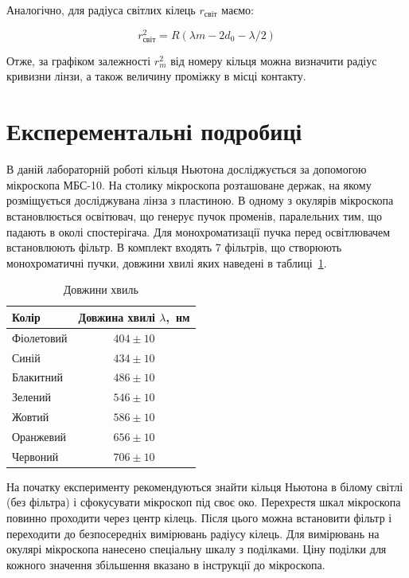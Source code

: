 \documentclass{LabWorkTemplate}
\begin{document}
Аналогічно, для радіуса світлих кілець $r_\text{світ}$ маємо:

\begin{equation}
\label{rlight}
r_\text{світ}^2=R(\lambda m-2d_{0}-\lambda/2)
\end{equation}

Отже, за графіком залежності $r^2_m$ від номеру кільця можна визначити радіус кривизни лінзи, а також величину проміжку в місці контакту.

\section{Експерементальні подробиці}


В даній лабораторній роботі кільця Ньютона досліджується за допомогою мікроскопа МБС-10. На столику мікроскопа розташоване держак, на якому розміщується досліджувана лінза з пластиною. В одному з окулярів мікроскопа встановлюється освітювач, що генерує пучок променів, паралельних тим, що падають в околі спостерігача. Для монохроматизації пучка перед освітлювачем встановлюють фільтр. В комплект входять 7 фільтрів, що створюють  монохроматичні пучки, довжини хвилі яких наведені в таблиці~\ref{WaveLength}.

\begin{table}
	\centering
	\begin{tabular}{lc}
		\toprule
		Колір                          & Довжина хвилі $\lambda$,~нм \\ \midrule
		\rowcolor{violet!10}Фіолетовий &             $ 404 \pm 10$             \\
		\rowcolor{blue!10}Синій        &             $ 434 \pm 10$             \\
		\rowcolor{cyan!10}Блакитний    &             $ 486 \pm 10 $             \\
		\rowcolor{green!10}Зелений     &             $ 546 \pm 10 $             \\
		\rowcolor{yellow!10}Жовтий     &             $ 586 \pm 10 $             \\
		\rowcolor{orange!10}Оранжевий  &             $ 656 \pm 10 $             \\
		\rowcolor{red!10}Червоний      &             $ 706 \pm 10 $             \\ \bottomrule
	\end{tabular}
	\caption{Довжини хвиль}
	\label{WaveLength}
\end{table}
На початку експерименту рекомендуються знайти кільця Ньютона в білому світлі (без фільтра) і сфокусувати мікроскоп під своє око. Перехрестя шкал мікроскопа повинно проходити через центр кілець. Після цього можна встановити фільтр і переходити до безпосередніх вимірювань радіусу кілець. Для вимірювань  на окулярі мікроскопа нанесено спеціальну шкалу з поділками. Ціну поділки для кожного значення збільшення вказано в інструкції до мікроскопа.
\end{document}
